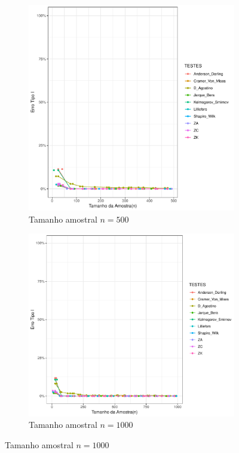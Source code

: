 \documentclass[a4paper,11pt]{article} %
\begin{document}
\begin{figure}[H]
    \vspace{0.5cm} %
    \begin{subfigure}[b]{0.45\textwidth}
        \centering
        \includegraphics[width=\textwidth]{Distribuição Cauchy/Erro Tipo I/erro_tipo_I_cauchy_500.pdf}
        \caption{Tamanho amostral \(n = 500\)}
        \label{fig:cauchy_500}
    \end{subfigure}
    \hfill
    \begin{subfigure}[b]{0.45\textwidth}
        \centering
        \includegraphics[width=\textwidth]{Distribuição cauchy/Erro Tipo I/erro_tipo_I_cauchy_1000.pdf}
        \caption{Tamanho amostral \(n = 1000\)}
        \label{fig:cauchy_1000}
    \end{subfigure}
\end{figure}
\end{document}
